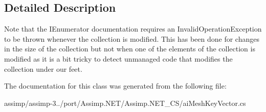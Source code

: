 \subsection{Detailed Description}
Note that the I\+Enumerator documentation requires an Invalid\+Operation\+Exception to be thrown whenever the collection is modified. This has been done for changes in the size of the collection but not when one of the elements of the collection is modified as it is a bit tricky to detect unmanaged code that modifies the collection under our feet. 

The documentation for this class was generated from the following file\+:\begin{DoxyCompactItemize}
\item 
assimp/assimp-\/3../port/\+Assimp.\+N\+E\+T/\+Assimp.\+N\+E\+T\+\_\+\+C\+S/ai\+Mesh\+Key\+Vector.\+cs\end{DoxyCompactItemize}
